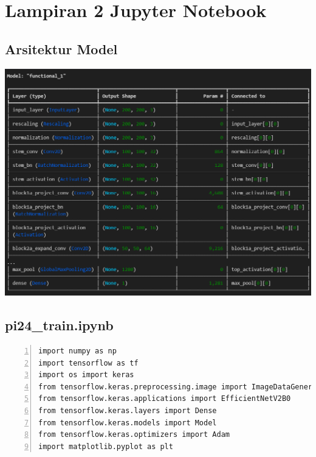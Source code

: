 \documentclass[12pt,oneside,bahasa]{book}
\begin{document}
\clearpage
{}

\section*{Lampiran 2 Jupyter Notebook}


\subsection*{Arsitektur Model}
\begin{center}
  \includegraphics[width=14cm]{images/model_1}
  \par\end{center}

\subsection*{pi24\_train.ipynb}

\begin{lstlisting}[numbers=left,basicstyle={\tiny},breaklines=true,showstringspaces=false,tabsize=5]
import numpy as np 
import tensorflow as tf 
import os import keras 
from tensorflow.keras.preprocessing.image import ImageDataGenerator, img_to_array, load_img 
from tensorflow.keras.applications import EfficientNetV2B0 
from tensorflow.keras.layers import Dense 
from tensorflow.keras.models import Model 
from tensorflow.keras.optimizers import Adam 
import matplotlib.pyplot as plt
\end{lstlisting}

\clearpage
{}
\end{document}
